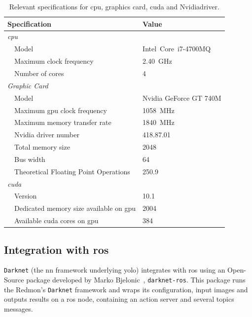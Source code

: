 \begin{table}[H]
	\renewcommand{\arraystretch}{1.2}
	\centering
	\begin{tabular}{@{}lp{7cm}l@{}}
		\toprule
		\multicolumn{2}{l}{Specification} & Value \\ \midrule
		\multicolumn{2}{l}{\emph{\ac{cpu}}} & \\
		\phantom{a} & Model   & Intel\cp~Core\texttrademark~i7-4700MQ \\
								& Maximum clock frequency & \SI{2.40}{\giga\hertz} \\
								& Number of cores & 4 \\ 
		\midrule
		\multicolumn{2}{l}{\emph{Graphic Card}} & \\
		\phantom{a} & Model   & Nvidia GeForce GT 740M \\
								& Maximum \ac{gpu} clock frequency & \SI{1058}{\mega\hertz} \\
								&	Maximum memory transfer rate & \SI{1840}{\mega\hertz} \\
								&	Nvidia driver number & 418.87.01 \\
								& Total memory size & \SI{2048}{\mega\byte} \\
								& Bus width & \SI{64}{\bytes} \\
								& Theoretical Floating Point Operations & \SI{250.9}{\giga\flops} \\
		\midrule 
		\multicolumn{2}{l}{\emph{\ac{cuda}\texttrademark}} \\
								&	Version & 10.1 \\
								&	Dedicated memory size available on \ac{gpu}& \SI{2004}{\mega\byte} \\
								& Available \ac{cuda} cores on \ac{gpu} & 384 \\
		\bottomrule
	\end{tabular}
	\caption{Relevant specifications for \ac{cpu}, graphics card, \ac{cuda} and Nvidia\texttrademark driver.}
	\label{tab:computer-specs}
\end{table}


\subsection{Integration with \ac{ros}}
\texttt{Darknet} (the \ac{nn} framework underlying \ac{yolo}) integrates with \ac{ros} using an Open-Source package developed by Marko Bjelonic~\cite{MarkoBjelonic}, \texttt{darknet-ros}. This package runs the Redmon's \texttt{Darknet} framework and wraps its configuration, input images and outputs results on a \ac{ros} node, containing an action server and several topics messages.

